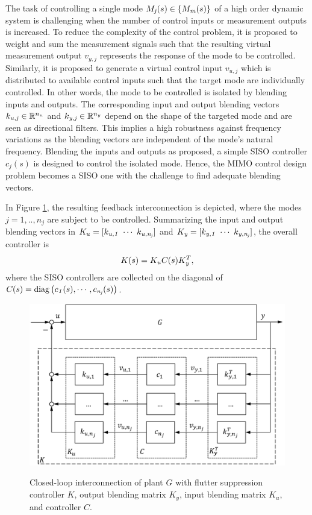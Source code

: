 \documentclass[aerospace,article,submit,moreauthors,pdftex,10pt,a4paper]{Definitions/mdpi}
\begin{document}
The task of controlling a single mode $\aemat{M}{j}(s) \in \{\aemat{M}{m}(s)\}$ of a high order dynamic system is challenging when the number of control inputs or measurement outputs is increased.
To reduce the complexity of the control problem, it is proposed to weight and sum the measurement signals such that the resulting virtual measurement output $v_{y,j}$ represents the response of the mode to be controlled. Similarly, it is proposed to generate a virtual control input $v_{u,j}$ which is distributed to available control inputs such that the target mode are individually controlled.
In other words, the mode to be controlled is isolated by blending inputs and outputs. The corresponding input and output blending vectors $\aevec{k}{u,j} \in \mathbb{R}^{n_u}$ and $\aevec{k}{y,j} \in \mathbb{R}^{n_y}$ depend on the shape of the targeted mode and are seen as directional filters.
This implies a high robustness against frequency variations as the blending vectors are independent of the mode's natural frequency. 
Blending the inputs and outputs as proposed, a simple \ac{SISO} controller $c_{j}(s)$ is designed to control the isolated mode. Hence, the \ac{MIMO} control design problem becomes a \ac{SISO} one with the challenge to find adequate blending vectors.

In Figure \ref{fig:clm}, the resulting feedback interconnection is depicted, where the modes $j=1,..,n_j$ are subject to be controlled. 
Summarizing the input and output blending vectors in $K_u=[ \aevec{k}{u,1}~\cdots~\aevec{k}{u,n_j}]$
and 
$\aemat{K}{y}=[\aevec{k}{y,1}~\cdots~\aevec{k}{y,n_j} ]$,
the overall controller is
\begin{align*}
\aemat{K}{}(s)=\aemat{K}{u} \aemat{C}{}(s) \aemat{K}{y}^T,
\end{align*}
where the \ac{SISO} controllers are collected on the diagonal of
$\aemat{C}{}(s)=\diag{\left( \aesym{c}{1}(s), \cdots , \aesym{c}{n_j}(s) \right)}$.

\begin{figure}[!htbp]
	\centering
	{\includegraphics[width=.8\textwidth]{figs/strct.pdf}}
	\caption{Closed-loop interconnection of plant 
		$G$ with flutter suppression controller $K$, output blending matrix $K_y$, input blending matrix $K_u$, and controller $C$.}
	\label{fig:clm}
\end{figure}
\end{document}

